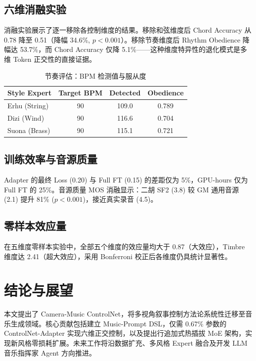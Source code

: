 \documentclass[twocolumn, a4paper, 10pt]{ctexart}
\begin{document}
\subsection{六维消融实验}
消融实验展示了逐一移除各控制维度的结果。移除和弦维度后 Chord Accuracy 从 0.78 降至 0.51（降幅 34.6\%, $p < 0.001$）。移除节奏维度后 Rhythm Obedience 降幅达 53.7\%，而 Chord Accuracy 仅降 5.1\%——这种维度特异性的退化模式是多维 Token 正交性的直接证据。

\begin{table}[H]
    \centering
    \caption{节奏评估：BPM 检测值与服从度}
    \small
    \begin{tabular}{lccc}
    \toprule
    \textbf{Style Expert} & \textbf{Target BPM} & \textbf{Detected} & \textbf{Obedience} \\
    \midrule
    Erhu (String) & 90 & 109.0 & 0.789 \\
    Dizi (Wind)   & 90 & 116.6 & 0.704 \\
    Suona (Brass) & 90 & 115.1 & 0.721 \\
    \bottomrule
    \end{tabular}
\end{table}

\subsection{训练效率与音源质量}
Adapter 的最终 Loss (0.20) 与 Full FT (0.15) 的差距仅为 5\%，GPU-hours 仅为 Full FT 的 25\%。音源质量 MOS 消融显示：二胡 SF2 (3.8) 较 GM 通用音源 (2.1) 提升 81\% ($p < 0.001$)，接近真实录音 (4.5)。

\subsection{零样本效应量}
在五维度零样本实验中，全部五个维度的效应量均大于 0.87（大效应），Timbre 维度达 2.41（超大效应），采用 Bonferroni 校正后各维度仍具统计显著性。

\section{结论与展望}

本文提出了 Camera-Music ControlNet，将多视角叙事控制方法论系统性迁移至音乐生成领域。核心贡献包括建立 Music-Prompt DSL，仅需 0.67\% 参数的 ControlNet-Adapter 实现六维正交控制，以及提出行追加式热插拔 MoE 架构，实现新风格零损耗扩展。未来工作将沿数据扩充、多风格 Expert 融合及开发 LLM 音乐指挥家 Agent 方向推进。
\end{document}
